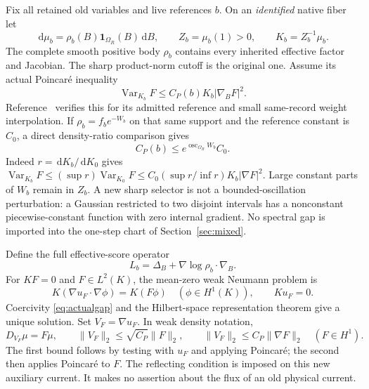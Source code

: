 \documentclass[11pt,letterpaper]{article}
\theoremstyle{plain}
\theoremstyle{remark}\newtheorem{remark}[theorem]{Scope}
\DeclareMathOperator{\Var}{Var}\DeclareMathOperator{\Cov}{Cov}
\DeclareMathOperator{\osc}{osc}\DeclareMathOperator{\Ad}{Ad}
\newcommand{\dd}{\,\mathrm d}\newcommand{\OH}{\mathcal O_H}
\newcommand{\ind}{\mathbf1}
\begin{document}
Fix all retained old variables and live references $b$. On an \emph{identified}
native fiber let
\begin{equation}
\dd\mu_b=\rho_b(B)\ind_{\Omega_R}(B)\dd B,\qquad
Z_b=\mu_b(1)>0,\qquad K_b=Z_b^{-1}\mu_b.
\label{eq:actualfiber}
\end{equation}
The complete smooth positive body $\rho_b$ contains every inherited effective
factor and Jacobian. The sharp product-norm cutoff is the original one. Assume
its actual Poincar\'e inequality
\begin{equation}
\Var_{K_b}F\le C_P(b)K_b|\nabla_BF|^2.
\label{eq:actualgap}
\end{equation}
Reference~\cite[\S4]{ND} verifies this for its admitted reference and small same-record weight
interpolation. If $\rho_b=f_be^{-W_b}$ on that same support and the reference
constant is $C_0$, a direct density-ratio comparison gives
\begin{equation}
C_P(b)\le e^{\osc_{\Omega_R}W_b}C_0.
\label{eq:oscillation}
\end{equation}
Indeed $r=\dd K_b/\dd K_0$ gives
$\Var_{K_b}F\le(\sup r)\Var_{K_0}F
\le C_0(\sup r/\inf r)K_b|\nabla F|^2$.
Large constant parts of $W_b$ remain in $Z_b$. A new sharp selector is not a
bounded-oscillation perturbation: a Gaussian restricted to two disjoint intervals
has a nonconstant piecewise-constant function with zero internal gradient.
No spectral gap is imported into the one-step chart of Section~\ref{sec:mixed}.

Define the full effective-score operator
\begin{equation}
L_b=\Delta_B+\nabla\log\rho_b\cdot\nabla_B.
\label{eq:Lb}
\end{equation}
For $KF=0$ and $F\in L^2(K)$, the mean-zero weak Neumann problem is
\begin{equation}
K(\nabla u_F\cdot\nabla\phi)=K(F\phi)\quad(\phi\in H^1(K)),
\qquad Ku_F=0.
\label{eq:weakPoisson}
\end{equation}
Coercivity \eqref{eq:actualgap} and the Hilbert-space representation theorem give
a unique solution. Set $V_F=\nabla u_F$. In weak density notation,
\begin{equation}
D_{V_F}\mu=F\mu,\qquad
\|V_F\|_2\le\sqrt{C_P}\|F\|_2,\qquad
\|V_F\|_2\le C_P\|\nabla F\|_2\quad(F\in H^1).
\label{eq:inverse}
\end{equation}
The first bound follows by testing with $u_F$ and applying Poincar\'e; the second
then applies Poincar\'e to $F$. The reflecting condition is imposed on this new
auxiliary current. It makes no assertion about the flux of an old physical current.
\end{document}

